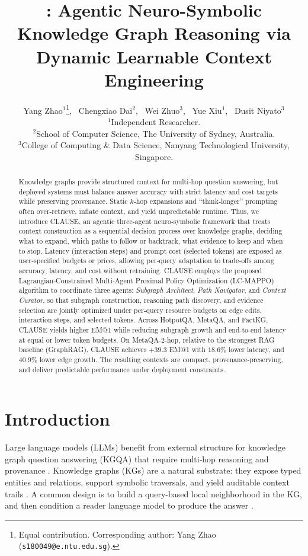 \documentclass{article} %
\title{\method: Agentic Neuro-Symbolic Knowledge Graph Reasoning via Dynamic Learnable Context Engineering }
\author{
Yang Zhao$^{1}$\thanks{Equal contribution. Corresponding author: Yang Zhao (\texttt{s180049@e.ntu.edu.sg}).},~
Chengxiao Dai$^{2}$\footnotemark[1],~
Wei Zhuo$^{3}$,~
Yue Xiu$^{1}$,~
Dusit Niyato$^{3}$\\
{\small $^{1}$Independent Researcher.}\\
{\small $^{2}$School of Computer Science, The University of Sydney, Australia.}\\
{\small $^{3}$College of Computing \& Data Science, Nanyang Technological University, Singapore.}
}
\newcommand{\method}{\textsc{CLAUSE}\xspace}
\newcommand{\kgs}{KGs\xspace}
\begin{document}
\maketitle




\begin{abstract}
Knowledge graphs provide structured context for multi‑hop question answering, but deployed systems must balance answer accuracy with strict latency and cost targets while preserving provenance. Static $k$‑hop expansions and ``think‑longer'' prompting often over‑retrieve, inflate context, and yield unpredictable runtime. Thus, we introduce \method, an agentic three-agent neuro‑symbolic framework that treats context construction as a sequential decision process over knowledge graphs, deciding what to expand, which paths to follow or backtrack, what evidence to keep and when to stop. Latency (interaction steps) and prompt cost (selected tokens) are exposed as user‑specified budgets or prices, allowing per‑query adaptation to trade‑offs among accuracy, latency, and cost without retraining. \method employs the proposed Lagrangian‑Constrained Multi‑Agent Proximal Policy Optimization (LC‑MAPPO) algorithm to coordinate three agents: \emph{Subgraph Architect}, \emph{Path Navigator}, and \emph{Context Curator}, so that subgraph construction, reasoning path discovery, and evidence selection are jointly optimized under per‑query resource budgets on edge edits, interaction steps, and selected tokens. Across HotpotQA, MetaQA, and FactKG, \method yields higher EM@1 while reducing subgraph growth and end-to-end latency at equal or lower token budgets. On MetaQA-2-hop, relative to the strongest RAG baseline (GraphRAG), \method achieves $+39.3$ EM@1 with $18.6\%$ lower latency, and $40.9\%$ lower edge growth. The resulting contexts are compact, provenance‑preserving, and deliver predictable performance under deployment constraints.
\end{abstract}




\section{Introduction}

Large language models (LLMs) benefit from external structure for knowledge graph question answering (KGQA) that require multi‑hop reasoning and provenance \citep{lewis2020rag,yang2018hotpotqa,pan2023llmkg}. Knowledge graphs (\kgs) are a natural substrate: they expose typed entities and relations, support symbolic traversals, and yield auditable context trails \citep{yasunaga2021qagnn,das2018minerva}. A common design is to build a query-based local neighborhood in the KG, and then condition a reader language model to produce the answer \citep{sun2019pullnet, ding2024epr}.
\end{document}
